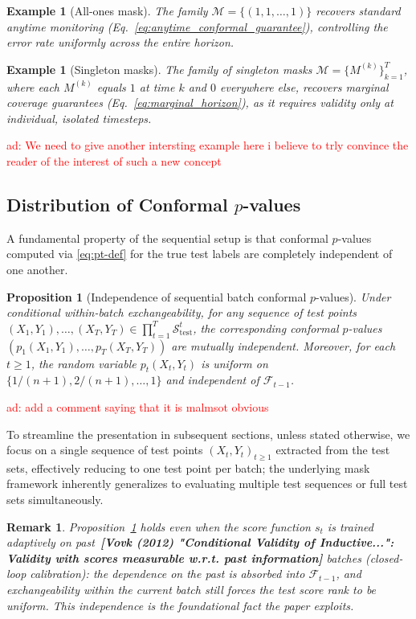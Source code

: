 \documentclass{uai2026} %
\newtheorem{proposition}[theorem]{Proposition}
\newtheorem*{remark}{Remark}
\newtheorem{example}[theorem]{Example}
\newcommand{\1}{\mathbf{1}}
\newcommand{\test}{\mathrm{test}}
\newcommand{\scal}{\mathcal{S}}
\newcommand{\F}{\mathcal{F}}
\newcommand{\mcal}{\mathcal{M}}
\newcommand{\scaltest}{\scal_{\test}}
\newcommand{\citeneeded}[1][]{{\color{red}\textbf{[#1]}}}
\newcommand{\aymeric}[1]{\textcolor{red}{ad: #1}}
\begin{document}
\begin{example}[All-ones mask]
  The family $\mcal = \{ (1, 1, \dots, 1) \}$ recovers standard anytime monitoring (Eq.~\ref{eq:anytime_conformal_guarantee}), controlling the error rate uniformly across the entire horizon.
\end{example}

\begin{example}[Singleton masks]
  The family of singleton masks $\mcal = \{ M^{(k)} \}_{k=1}^T$, where each $M^{(k)}$ equals $1$ at time $k$ and $0$ everywhere else, recovers marginal coverage guarantees (Eq.~\ref{eq:marginal_horizon}), as it requires validity only at individual, isolated timesteps.
\end{example}

\aymeric{We need to give another intersting example here i believe to trly convince the reader of the interest of such a new concept}

\subsection{Distribution of Conformal \texorpdfstring{$p$}{p}-values}
\label{sec:distribution-pvalues}

A fundamental property of the sequential setup is that conformal $p$-values computed via \eqref{eq:pt-def} for the true test labels are completely independent of one another.

\begin{proposition}[Independence of sequential batch conformal $p$-values]
  \label{prop:iid-pvalues}
  Under conditional within-batch exchangeability, for any sequence of test points $(X_1,Y_1), \ldots, (X_T,Y_T) \in \prod_{t=1}^{T} \scaltest^t$, the corresponding conformal $p$-values $(p_1(X_1,Y_1), \ldots, p_T(X_T, Y_T))$ are mutually independent.
  Moreover, for each $t\ge 1$, the random variable $p_t(X_t, Y_t)$ is uniform on $\{1/(n+1),2/(n+1),\ldots,1\}$ and independent of $\F_{t-1}$.
\end{proposition}
 \aymeric{add a comment saying that it is malmsot obvious}

To streamline the presentation in subsequent sections, unless stated otherwise, we focus on a single sequence of test points $(X_t,Y_t)_{t\ge 1}$ extracted from the test sets, effectively reducing to one test point per batch; the underlying mask framework inherently generalizes to evaluating multiple test sequences or full test sets simultaneously.

\begin{remark}
  Proposition~\ref{prop:iid-pvalues} holds even when the score function $s_t$ is trained adaptively on past~\citeneeded[Vovk (2012) "Conditional Validity of Inductive...": Validity with scores measurable w.r.t. past information] batches (closed-loop calibration): the dependence on the past is absorbed into $\F_{t-1}$, and exchangeability within the current batch still forces the test score rank to be uniform.
  This independence is the foundational fact the paper exploits.
\end{remark}
\end{document}

